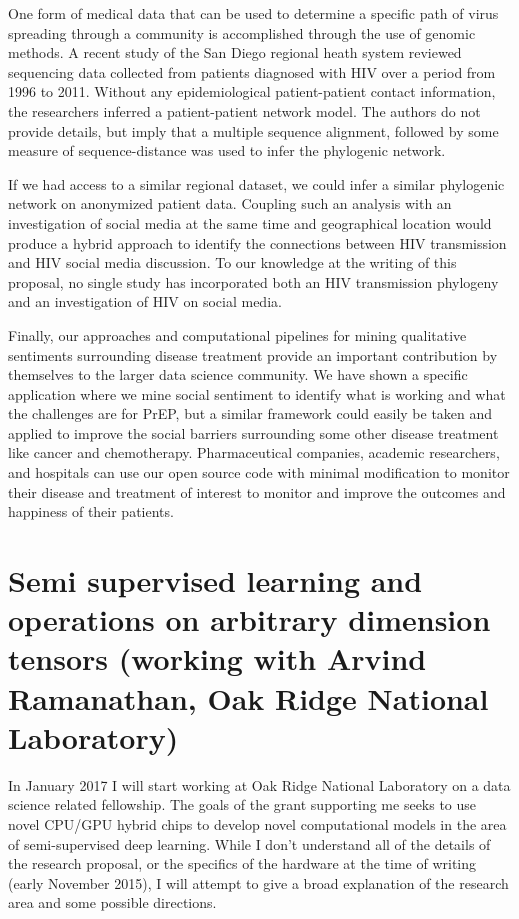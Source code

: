 One form of medical data that can be used to determine a specific path of virus spreading through a community is accomplished through the use of genomic methods. A recent study of the San Diego regional heath system reviewed sequencing data collected from patients diagnosed with HIV over a period from 1996 to 2011\cite{little2014using}. Without any epidemiological patient-patient contact information, the researchers inferred a patient-patient network model. The authors do not provide details, but imply that a multiple sequence alignment, followed by some measure of sequence-distance was used to infer the phylogenic network.

If we had access to a similar regional dataset, we could infer a similar phylogenic network on anonymized patient data. Coupling such an analysis with an investigation of social media at the same time and geographical location would produce a hybrid approach to identify the connections between HIV transmission and HIV social media discussion. To our knowledge at the writing of this proposal, no single study has incorporated both an HIV transmission phylogeny and an investigation of HIV on social media.

Finally, our approaches and computational pipelines for mining qualitative sentiments surrounding disease treatment provide an important contribution by themselves to the larger data science community. We have shown a specific application where we mine social sentiment to identify what is working and what the challenges are for PrEP, but a similar framework could easily be taken and applied to improve the social barriers surrounding some other disease treatment like cancer and chemotherapy. Pharmaceutical companies, academic researchers, and hospitals can use our open source code with minimal modification to monitor their disease and treatment of interest to monitor and improve the outcomes and happiness of their patients.


\section{Semi supervised learning and operations on arbitrary dimension tensors (working with Arvind Ramanathan, Oak Ridge National Laboratory)}

In January 2017 I will start working at Oak Ridge National Laboratory on a data science related fellowship. The goals of the grant supporting me seeks to use novel CPU/GPU hybrid chips to develop novel computational models in the area of semi-supervised deep learning. While I don't understand all of the details of the research proposal, or the specifics of the hardware at the time of writing (early November 2015), I will attempt to give a broad explanation of the research area and some possible directions.

